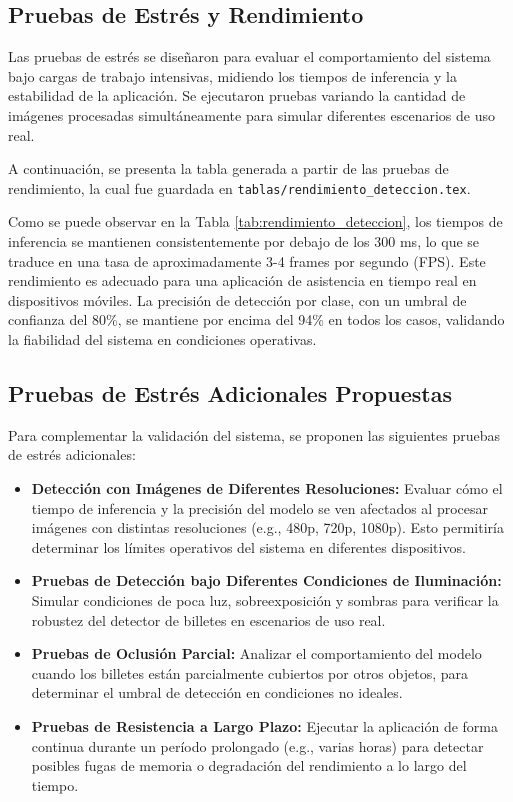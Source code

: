 \documentclass[10pt,a4paper]{report}
\begin{document}
\subsection{Pruebas de Estrés y Rendimiento}

Las pruebas de estrés se diseñaron para evaluar el comportamiento del sistema bajo cargas de trabajo intensivas, midiendo los tiempos de inferencia y la estabilidad de la aplicación. Se ejecutaron pruebas variando la cantidad de imágenes procesadas simultáneamente para simular diferentes escenarios de uso real.

A continuación, se presenta la tabla generada a partir de las pruebas de rendimiento, la cual fue guardada en \texttt{tablas/rendimiento\_deteccion.tex}.



Como se puede observar en la Tabla \ref{tab:rendimiento_deteccion}, los tiempos de inferencia se mantienen consistentemente por debajo de los 300 ms, lo que se traduce en una tasa de aproximadamente 3-4 frames por segundo (FPS). Este rendimiento es adecuado para una aplicación de asistencia en tiempo real en dispositivos móviles. La precisión de detección por clase, con un umbral de confianza del 80\%, se mantiene por encima del 94\% en todos los casos, validando la fiabilidad del sistema en condiciones operativas.

\subsection{Pruebas de Estrés Adicionales Propuestas}

Para complementar la validación del sistema, se proponen las siguientes pruebas de estrés adicionales:

\begin{itemize}
    \item \textbf{Detección con Imágenes de Diferentes Resoluciones:} Evaluar cómo el tiempo de inferencia y la precisión del modelo se ven afectados al procesar imágenes con distintas resoluciones (e.g., 480p, 720p, 1080p). Esto permitiría determinar los límites operativos del sistema en diferentes dispositivos.
    \item \textbf{Pruebas de Detección bajo Diferentes Condiciones de Iluminación:} Simular condiciones de poca luz, sobreexposición y sombras para verificar la robustez del detector de billetes en escenarios de uso real.
    \item \textbf{Pruebas de Oclusión Parcial:} Analizar el comportamiento del modelo cuando los billetes están parcialmente cubiertos por otros objetos, para determinar el umbral de detección en condiciones no ideales.
    \item \textbf{Pruebas de Resistencia a Largo Plazo:} Ejecutar la aplicación de forma continua durante un período prolongado (e.g., varias horas) para detectar posibles fugas de memoria o degradación del rendimiento a lo largo del tiempo.
\end{itemize}
\end{document}
